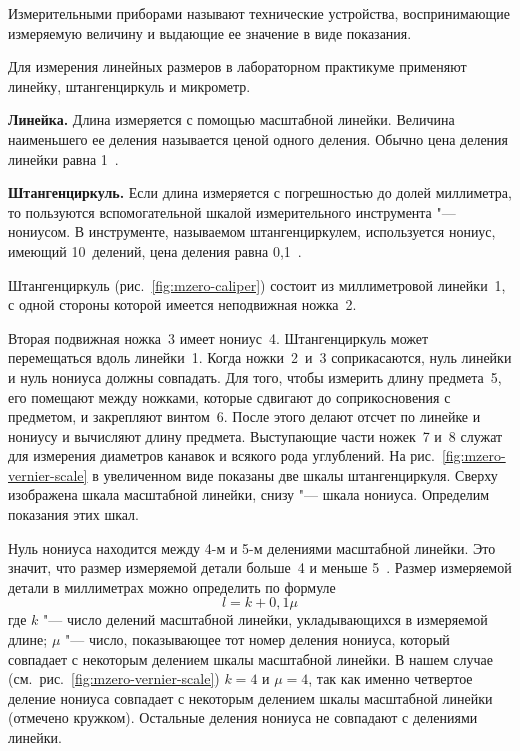 \documentclass[a4paper, 12pt]{extarticle}
\begin{document}
Измерительными приборами называют технические устройства, воспринимающие измеряемую величину и выдающие ее значение в виде показания.

Для измерения линейных размеров в лабораторном практикуме применяют линейку, штангенциркуль и микрометр.


\textbf{Линейка. \quad}
Длина измеряется с помощью масштабной линейки.
Величина  наименьшего ее деления называется ценой одного деления.
Обычно цена деления линейки равна 1~.

\textbf{Штангенциркуль. \quad}
Если длина измеряется с погрешностью до долей миллиметра, то пользуются вспомогательной шкалой измерительного инструмента "--- нониусом. В инструменте, называемом штангенциркулем, используется нониус, имеющий 10~делений, цена деления равна 0,1~.

Штангенциркуль (рис.~\ref{fig:mzero-caliper}) состоит из миллиметровой линейки~1, с одной стороны которой имеется неподвижная ножка~2.

Вторая подвижная ножка~3 имеет нониус~4. %
Штангенциркуль может перемещаться вдоль линейки~1. Когда ножки~2~и~3 соприкасаются, нуль линейки и нуль нониуса должны совпадать. Для того, чтобы измерить длину предмета~5, его помещают между ножками, которые сдвигают до соприкосновения с предметом, и закрепляют винтом~6. После этого делают отсчет по линейке и нониусу и вычисляют длину предмета. Выступающие части ножек~7 и~8 служат для измерения диаметров канавок и всякого рода углублений. На рис.~\ref{fig:mzero-vernier-scale} в увеличенном виде показаны две шкалы штангенциркуля. Сверху изображена шкала масштабной линейки,  снизу "--- шкала нониуса. Определим показания этих шкал.

Нуль нониуса находится между 4-м и 5-м делениями масштабной линейки. Это значит, что размер измеряемой детали больше~4 и меньше 5~. Размер измеряемой детали в миллиметрах можно определить по формуле
\begin{equation}
\label{eq:how-do-i-caliper}
l = k + 0,1\mu
\end{equation}
где $k$ "--- число делений масштабной линейки, укладывающихся в измеряемой длине;  $\mu$ "--- число, показывающее тот номер деления нониуса, который совпадает  с некоторым делением шкалы масштабной линейки. В нашем случае (см.~рис.~\ref{fig:mzero-vernier-scale}) $k = 4$ и $\mu = 4$, так как именно четвертое деление нониуса совпадает с некоторым делением шкалы масштабной линейки (отмечено кружком). Остальные деления нониуса не совпадают с делениями линейки.
\end{document}
